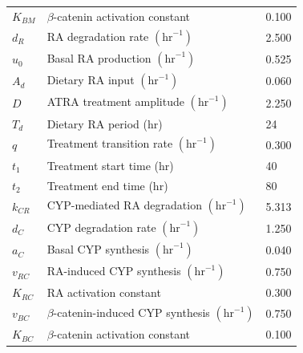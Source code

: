 \documentclass[11pt]{article}
\begin{document}
\begin{longtable}{lll}
$K_{BM}$ & $\beta$-catenin activation constant & 0.100\\
$d_R$ & RA degradation rate $(\mathrm{hr}^{-1})$ & 2.500\\
$u_0$ & Basal RA production $(\mathrm{hr}^{-1})$ & 0.525\\
$A_d$ & Dietary RA input $(\mathrm{hr}^{-1})$ & 0.060\\
$D$ & ATRA treatment amplitude $(\mathrm{hr}^{-1})$ & 2.250\\
$T_d$ & Dietary RA period (hr) & 24\\
$q$ & Treatment transition rate $(\mathrm{hr}^{-1})$ & 0.300\\
$t_1$ & Treatment start time (hr) & 40\\
$t_2$ & Treatment end time (hr) & 80\\
$k_{CR}$ & CYP-mediated RA degradation $(\mathrm{hr}^{-1})$ & 5.313\\
$d_C$ & CYP degradation rate $(\mathrm{hr}^{-1})$ & 1.250\\
$a_C$ & Basal CYP synthesis $(\mathrm{hr}^{-1})$ & 0.040\\
$v_{RC}$ & RA-induced CYP synthesis $(\mathrm{hr}^{-1})$ & 0.750\\
$K_{RC}$ & RA activation constant & 0.300\\
$v_{BC}$ & $\beta$-catenin-induced CYP synthesis $(\mathrm{hr}^{-1})$ & 0.750\\
$K_{BC}$ & $\beta$-catenin activation constant & 0.100\\

\end{longtable}
\end{document}
